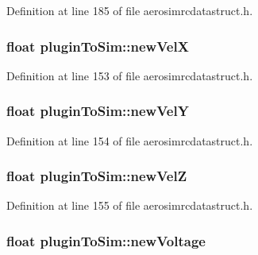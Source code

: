 \-Definition at line 185 of file aerosimrcdatastruct.\-h.

\hypertarget{group___aero_sim_r_c_ga963869a7b3f6432a6b42f9f239de0ca8}{
\subsubsection[{new\-Vel\-X}]{\setlength{\rightskip}{0pt plus 5cm}float {\bf plugin\-To\-Sim\-::new\-Vel\-X}}}\label{group___aero_sim_r_c_ga963869a7b3f6432a6b42f9f239de0ca8}


\-Definition at line 153 of file aerosimrcdatastruct.\-h.

\hypertarget{group___aero_sim_r_c_ga4ef77620e6e374b2af2bbd4e0d88fcfe}{
\subsubsection[{new\-Vel\-Y}]{\setlength{\rightskip}{0pt plus 5cm}float {\bf plugin\-To\-Sim\-::new\-Vel\-Y}}}\label{group___aero_sim_r_c_ga4ef77620e6e374b2af2bbd4e0d88fcfe}


\-Definition at line 154 of file aerosimrcdatastruct.\-h.

\hypertarget{group___aero_sim_r_c_ga09bc17352168fa2e9b782170e27c7c2b}{
\subsubsection[{new\-Vel\-Z}]{\setlength{\rightskip}{0pt plus 5cm}float {\bf plugin\-To\-Sim\-::new\-Vel\-Z}}}\label{group___aero_sim_r_c_ga09bc17352168fa2e9b782170e27c7c2b}


\-Definition at line 155 of file aerosimrcdatastruct.\-h.

\hypertarget{group___aero_sim_r_c_ga6a11d71df14bc0a5867c993a47da8f0f}{
\subsubsection[{new\-Voltage}]{\setlength{\rightskip}{0pt plus 5cm}float {\bf plugin\-To\-Sim\-::new\-Voltage}}}\label{group___aero_sim_r_c_ga6a11d71df14bc0a5867c993a47da8f0f}


